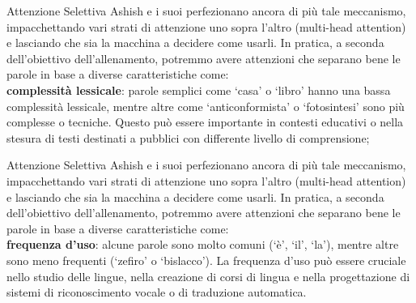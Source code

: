 \documentclass[aspectratio=169]{beamer}
\begin{document}
%
%
\begin{frame}{Attenzione Selettiva}
Ashish e i suoi perfezionano ancora di più tale meccanismo, impacchettando vari strati di attenzione uno sopra l’altro (multi-head attention) e lasciando che sia la macchina a decidere come usarli. In pratica, a seconda dell’obiettivo dell’allenamento, potremmo avere attenzioni che separano bene le parole in base a diverse caratteristiche come: \\
\vspace{0.5cm}
\textbf{complessità lessicale}: parole semplici come ‘casa’ o ‘libro’ hanno una bassa complessità lessicale, mentre altre come ‘anticonformista’ o ‘fotosintesi’ sono più complesse o tecniche. Questo può essere importante in contesti educativi o nella stesura di testi destinati a pubblici con differente livello di comprensione;
\end{frame}
%
%
\begin{frame}{Attenzione Selettiva}
Ashish e i suoi perfezionano ancora di più tale meccanismo, impacchettando vari strati di attenzione uno sopra l’altro (multi-head attention) e lasciando che sia la macchina a decidere come usarli. In pratica, a seconda dell’obiettivo dell’allenamento, potremmo avere attenzioni che separano bene le parole in base a diverse caratteristiche come: \\
\vspace{0.5cm}
\textbf{frequenza d’uso}: alcune parole sono molto comuni (‘è’, ‘il’, ‘la’), mentre altre sono meno frequenti (‘zefiro’ o ‘bislacco’). La frequenza d’uso può essere cruciale nello studio delle lingue, nella creazione di corsi di lingua e nella progettazione di sistemi di riconoscimento vocale o di traduzione automatica.
\end{frame}
%
\end{document}
